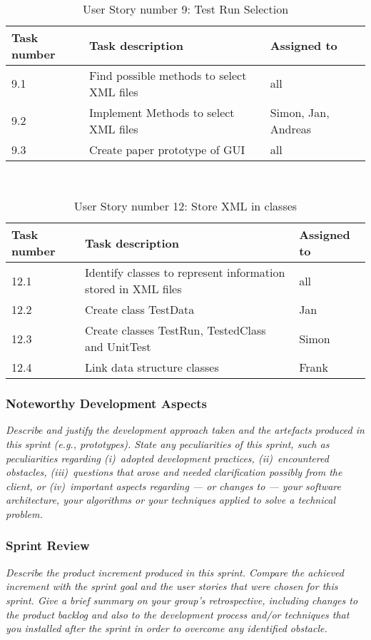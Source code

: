 \ \\

\begin{table}[h]
  \caption{User Story number 9: Test Run Selection}
  \label{US_Selection}
  \centering
  \begin{tabular}{p{1.5cm}|p{9cm}|p{3cm}|}
  	Task number & Task description & Assigned to \\ 
  	\hline
  	\hline
  	9.1 & Find possible methods to select XML files & all \\ 
  	\hline
  	9.2 & Implement Methods to select XML files & Simon, Jan, Andreas \\ 
  	\hline
  	9.3 & Create paper prototype of GUI & all \\
  	\hline
  \end{tabular}
\end{table} 

\ \\ 

\begin{table}[h]
  \caption{User Story number 12: Store XML in classes}
  \label{US_Storage}
  \centering
  \begin{tabular}{p{1.5cm}|p{9cm}|p{3cm}|}
  	Task number & Task description & Assigned to \\ 
  	\hline
  	\hline
  	12.1 & Identify classes to represent information stored in XML files & all \\ 
  	\hline
  	12.2 & Create class TestData & Jan \\ 
  	\hline
  	12.3 & Create classes TestRun, TestedClass and UnitTest & Simon \\ 
  	\hline
  	12.4 & Link data structure classes & Frank \\ 
  	\hline
  \end{tabular}
\end{table} 

\subsubsection*{Noteworthy Development Aspects}

\emph{Describe and justify the development approach taken and the artefacts produced in this sprint (e.g., prototypes).  State any peculiarities of this sprint, such as peculiarities  regarding (i)~adopted development practices, (ii)~encountered obstacles, (iii)~questions that arose and needed clarification possibly from the client, or (iv)~important aspects regarding --- or changes to --- your software architecture, your algorithms or your techniques applied to solve a technical problem.}

\subsubsection*{Sprint Review}

\emph{Describe the product increment produced in this sprint. Compare the achieved increment with the sprint goal and the user stories that were chosen for this sprint. Give a brief summary on your group's retrospective, including changes to the product backlog and also to the development process and/or techniques that you installed after the sprint in order to overcome any identified obstacle.}

